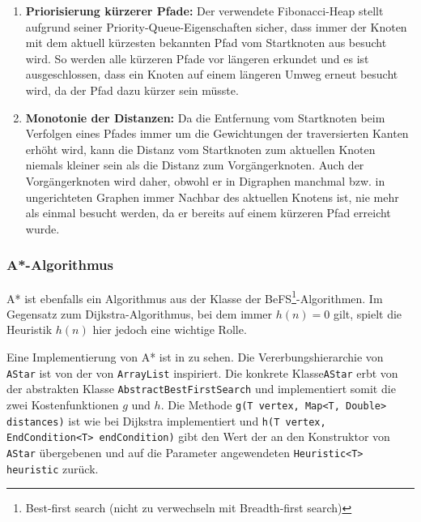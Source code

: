                 \begin{enumerate}
                    \item \textbf{Priorisierung kürzerer Pfade:} Der verwendete Fibonacci-Heap stellt aufgrund seiner Priority-Queue-Eigenschaften sicher, dass immer der Knoten mit dem aktuell kürzesten bekannten Pfad vom Startknoten aus besucht wird. So werden alle kürzeren Pfade vor längeren erkundet und es ist ausgeschlossen, dass ein Knoten auf einem längeren Umweg erneut besucht wird, da der Pfad dazu kürzer sein müsste. \cite{EZ:Web50}
                
                    \item \textbf{Monotonie der Distanzen:} Da die Entfernung vom Startknoten beim Verfolgen eines Pfades immer um die Gewichtungen der traversierten Kanten erhöht wird, kann die Distanz vom Startknoten zum aktuellen Knoten niemals kleiner sein als die Distanz zum Vorgängerknoten. Auch der Vorgängerknoten wird daher, obwohl er in Digraphen manchmal bzw. in ungerichteten Graphen immer Nachbar des aktuellen Knotens ist, nie mehr als einmal besucht werden, da er bereits auf einem kürzeren Pfad erreicht wurde.
                \end{enumerate}
    
                
                
            \subsubsection{A*-Algorithmus} \label{astar}
    
                A* ist ebenfalls ein Algorithmus aus der Klasse der BeFS\footnote{Best-first search (nicht zu verwechseln mit Breadth-first search)}-Algorithmen. Im Gegensatz zum Dijkstra-Algorithmus, bei dem immer $h(n) = 0$ gilt, spielt die Heuristik $h(n)$ hier jedoch eine wichtige Rolle.
                
                Eine Implementierung von A* ist in  zu sehen. Die Vererbungshierarchie von \lstinline{AStar} ist von der von \lstinline{ArrayList} inspiriert. Die konkrete Klasse\lstinline{AStar} erbt von der abstrakten Klasse \lstinline{AbstractBestFirstSearch} und implementiert somit die zwei Kostenfunktionen $g$ und $h$. Die Methode \lstinline{g(T vertex, Map<T, Double> distances)} ist wie bei Dijkstra implementiert und \lstinline{h(T vertex, EndCondition<T> endCondition)} gibt den Wert der an den Konstruktor von \lstinline{AStar} übergebenen und auf die Parameter angewendeten \lstinline{Heuristic<T> heuristic} zurück.
                
